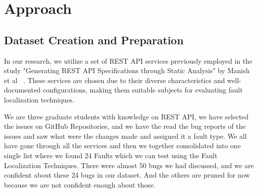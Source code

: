 \documentclass[conference]{IEEEtran}
\begin{document}




\section{Approach}
\label{sec:approach}

\subsection{Dataset Creation and Preparation}

In our research, we utilize a set of REST API services previously employed in the study "Generating REST API Specifications through Static Analysis" by Manish et al ~\cite{ManishRestServices}. These services are chosen due to their diverse characteristics and well-documented configurations, making them suitable subjects for evaluating fault localization techniques. 

We are three graduate students with knowledge on REST API, we have selected the issues on GitHub Repositories, and we have the read the bug reports of the issues and saw what were the changes made and assigned it a fault type. We all have gone through all the services and then we together consolidated into one single list where we found 24 Faults which we can test using the Fault Localization Techniques. 
There were almost 50 bugs we had discussed, and we are confident about these 24 bugs in our dataset. And the others are pruned for now because we are not confident enough about those.

\end{document}
